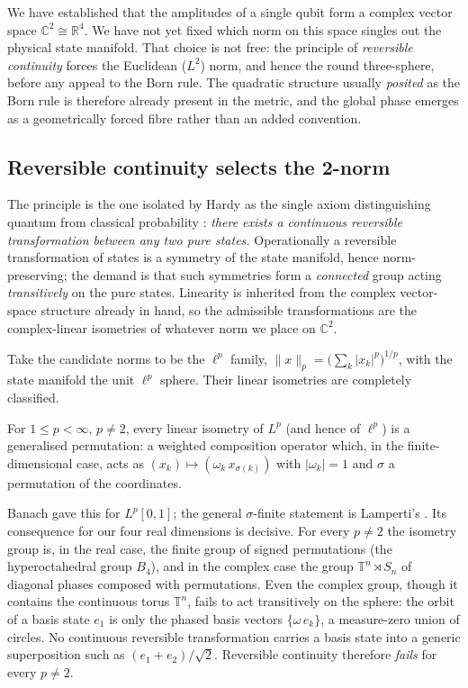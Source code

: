 We have established that the amplitudes of a single qubit form a complex vector space $\mathbb{C}^{2}\cong\mathbb{R}^{4}$. We have not yet fixed which norm on this space singles out the physical state manifold. That choice is not free: the principle of \emph{reversible continuity} forces the Euclidean ($L^{2}$) norm, and hence the round three-sphere, before any appeal to the Born rule. The quadratic structure usually \emph{posited} as the Born rule is therefore already present in the metric, and the global phase emerges as a geometrically forced fibre rather than an added convention.

\subsection{Reversible continuity selects the 2-norm}
\label{sec:reversible-continuity-l2}

The principle is the one isolated by Hardy as the single axiom distinguishing quantum from classical probability \autocite{Hardy2001a}: \emph{there exists a continuous reversible transformation between any two pure states.} Operationally a reversible transformation of states is a symmetry of the state manifold, hence norm-preserving; the demand is that such symmetries form a \emph{connected} group acting \emph{transitively} on the pure states. Linearity is inherited from the complex vector-space structure already in hand, so the admissible transformations are the complex-linear isometries of whatever norm we place on $\mathbb{C}^{2}$.

Take the candidate norms to be the $\ell^{p}$ family, $\lVert x\rVert_{p}=\bigl(\sum_{k}\lvert x_{k}\rvert^{p}\bigr)^{1/p}$, with the state manifold the unit $\ell^{p}$ sphere. Their linear isometries are completely classified.


\begin{proposition}
\label{prop:lamperti}
For $1\le p<\infty$, $p\neq 2$, every linear isometry of $L^{p}$ (and hence of $\ell^{p}$) is a generalised permutation: a weighted composition operator which, in the finite-dimensional case, acts as $(x_{k})\mapsto(\omega_{k}\,x_{\sigma(k)})$ with $\lvert\omega_{k}\rvert=1$ and $\sigma$ a permutation of the coordinates.
\end{proposition}

\noindent Banach gave this for $L^{p}[0,1]$; the general $\sigma$-finite
statement is Lamperti's \autocite{Banach1932, Lamperti1958}. Its consequence for
our four real dimensions is decisive. For every $p\neq 2$ the isometry group is,
in the real case, the finite group of signed permutations (the hyperoctahedral
group $B_{4}$), and in the complex case the group $\mathbb{T}^{n}\rtimes S_{n}$
of diagonal phases composed with permutations. Even the complex group, though it
contains the continuous torus $\mathbb{T}^{n}$, fails to act transitively on the
sphere: the orbit of a basis state $e_{1}$ is only the phased basis vectors
$\{\omega\,e_{k}\}$, a measure-zero union of circles. No continuous reversible
transformation carries a basis state into a generic superposition such as
$(e_{1}+e_{2})/\sqrt{2}$. Reversible continuity therefore \emph{fails} for every
$p\neq 2$.

